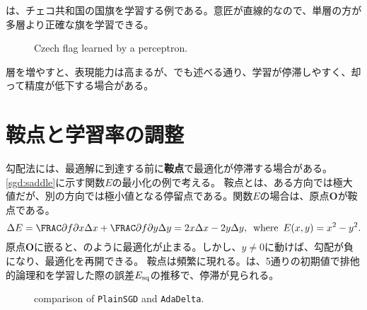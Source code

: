 \documentclass[10pt,a4paper]{book}
\begin{document}
は、チェコ共和国の国旗を学習する例である。意匠が直線的なので、単層の方が多層より正確な旗を学習できる。

\begin{figure}[h]
\centering
{}
\caption{Czech flag learned by a perceptron.\label{fig:mcp.czech}}
\end{figure}

層を増やすと、表現能力は高まるが、でも述べる通り、学習が停滞しやすく、却って精度が低下する場合がある。

\section{鞍点と学習率の調整\label{sect:nn.sgd}}

勾配法には、最適解に到達する前に\textbf{鞍点}で最適化が停滞する場合がある。\eqref{sgd:saddle}に示す関数$E$の最小化の例で考える。
鞍点とは、ある方向では極大値だが、別の方向では極小値となる停留点である。関数$E$の場合は、原点$\bm{O}$が鞍点である。
%
\begin{equation}
\label{eq:sgd:saddle}
\Delta E = \pdiff{f}{x} \Delta x + \pdiff{f}{y} \Delta y = 2x \Delta x - 2y \Delta y,
\where
E(x,y) = x^2 - y^2.
\end{equation}
%
原点$\bm{O}$に嵌ると、のように最適化が止まる。しかし、$y\neq0$に動けば、勾配が負になり、最適化を再開できる。
鞍点は頻繁に現れる。は、5通りの初期値で排他的論理和を学習した際の誤差$E_\mathrm{sq}$の推移で、停滞が見られる。

\begin{figure}[h]
\centering
{}
\caption{comparison of \texttt{PlainSGD} and \texttt{AdaDelta}.\label{fig:sgd}}
\end{figure}
\end{document}
